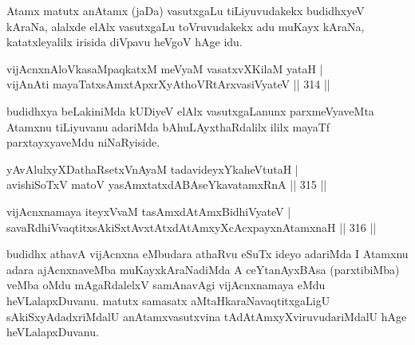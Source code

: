 \begin{artha}
Atamx matutx anAtamx (jaDa) vasutxgaLu tiLiyuvudakekx budidhxyeV kAraNa, alalxde elAlx vasutxgaLu toVruvudakekx adu muKayx kAraNa, katatxleyalilx irisida diVpavu heVgoV hAge idu.
\end{artha}


\begin{shl}
vijAcnxnAloVkasaMpaqkatxM meVyaM vasatxvXKilaM yataH | \\
vijAnAti mayaTatxsAmxtApxrXyAthoVR\s tArxvasiVyateV \hfill||  314 ||  
\end{shl}

\begin{artha}
budidhxya beLakiniMda kUDiyeV elAlx vasutxgaLanunx parxmeVyaveMta Atamxnu tiLiyuvanu adariMda bAhuLAyxthaRdalilx ililx mayaTf parxtayxyaveMdu niNaRyiside.
\end{artha}

\begin{shl}
\footnotemark[1]{}yAvAlulxyXDathaRsetxVnAyaM tadavideyxYkaheVtutaH | \\
avishiSoTxV matoV yasAmxtatxdABAseYkavatamxRnA \hfill||  315 || 
\end{shl}
				
\begin{shl}
vijAcnxnamaya iteyxVvaM tasAmxdAtAmx\s BidhiVyateV | \\
savaRdhiVvaqtitxsAkiSxtAvxtAtxdAtAmxyXcAcxpayxnAtamxnaH \hfill||  316 || 
\end{shl}

\begin{artha}
budidhx athavA vijAcnxna eMbudara athaRvu eSuTx ideyo adariMda I Atamxnu adara ajAcnxnaveMba muKayxkAraNadiMda A ceYtanAyxBAsa (parxtibiMba) veMba oMdu mAgaRdalelxV samAnavAgi vijAcnxnamaya eMdu heVLalapxDuvanu. matutx samasatx aMtaHkaraNavaqtitxgaLigU sAkiSxyAdadxriMdalU anAtamxvasutxvina tAdAtAmxyXviruvudariMdalU hAge heVLalapxDuvanu.
\end{artha}



